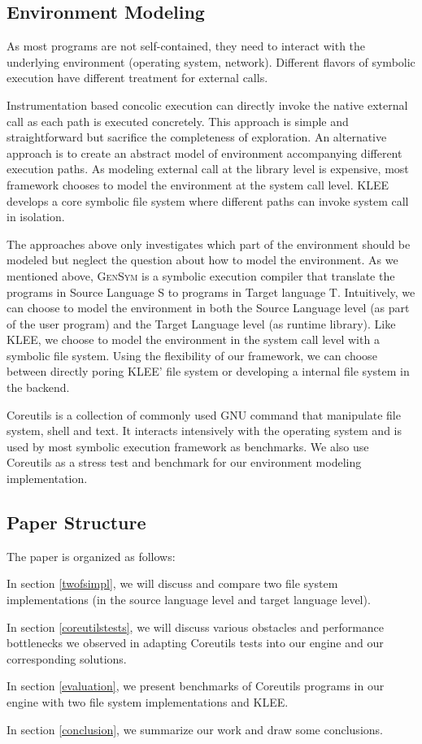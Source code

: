 \documentclass[sigplan, nonacm]{acmart}\settopmatter{printfolios=true,printccs=false,printacmref=false}
\newcommand{\tool}{\textsc{GenSym}\xspace}
\begin{document}
\subsection{Environment Modeling}
As most programs are not self-contained, they need to interact with the underlying environment (operating system, network). Different flavors of symbolic execution have different treatment for external calls. \par
Instrumentation based concolic execution can directly invoke the native external call as each path is executed concretely. This approach is simple and straightforward but sacrifice the completeness of exploration. An alternative approach is to create an abstract model of environment accompanying different execution paths. As modeling external call at the library level is expensive, most framework chooses to model the environment at the system call level.
 KLEE\cite{cadar2008klee} develops a core symbolic file system where different paths can invoke system call in isolation. \par
The approaches above only investigates which part of the environment should be modeled but neglect the question about how to model the environment. As we mentioned above, \tool is a symbolic execution compiler that translate the programs in Source Language S to programs in Target language T. Intuitively, we can choose to model the environment in both the Source Language level (as part of the user program) and the Target Language level (as runtime library). Like KLEE, we choose to model the environment in the system call level with a symbolic file system. Using the flexibility of our framework, we can choose between directly poring KLEE' file system or developing a internal file system in the backend.\par
Coreutils \cite{coreutilsweb} is a collection of commonly used GNU command that manipulate file system, shell and text. It interacts intensively with the operating system and is used by most symbolic execution framework as benchmarks. We also use Coreutils as a stress test and benchmark for our environment modeling implementation.
\subsection{Paper Structure}
The paper is organized as follows: \par \par
In section \ref{twofsimpl}, we will discuss and compare two file system implementations (in the source language level and target language level).\par
In section \ref{coreutilstests}, we will discuss various obstacles and performance bottlenecks we observed in  adapting Coreutils tests into our engine and our corresponding solutions.\par
In section \ref{evaluation}, we present benchmarks of Coreutils programs in our engine with two file system implementations and KLEE.\par
In section \ref{conclusion}, we summarize our work and draw some conclusions.
\end{document}
